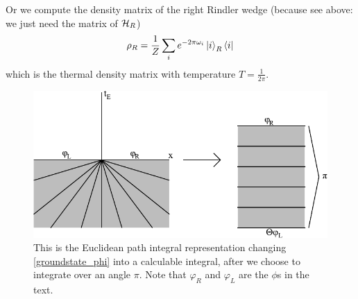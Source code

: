 	Or we compute the density matrix of the right Rindler wedge (because see above: we just need the matrix of $\mathcal{H}_R$)
	\begin{align}
		\rho_R= \frac{1}{Z} \sum_i e^{-2\pi\omega_i} \ket{i}_R \bra{i}
	\end{align}
	which is the thermal density matrix with temperature $T=\frac{1}{2\pi}$. 
	\begin{figure}[tbp]
		\begin{center}
			\includegraphics[scale=1]{eucpath}
			\caption{This is the Euclidean path integral representation changing \eqref{groundstate_phi} into a calculable integral, after we choose to integrate over an angle $\pi$. Note that $\varphi_R$ and $\varphi_L$ are the $\phi$s in the text.}\label{eucpath}
		\end{center}
	\end{figure}